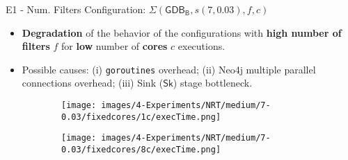 \begin{frame}{E1 - Num. Filters Configuration: \small{$\Sigma(\mathsf{GDB_B}, s(7, 0.03), f, c)$}}
\begin{itemize}
    \item \textbf{Degradation} of the behavior of the configurations with \textbf{high number of filters} $f$ for \textbf{low} number of \textbf{cores} $c$ executions.
    \item Possible causes: (i) \texttt{goroutines} overhead; (ii) Neo4j multiple parallel connections overhead; (iii) Sink ($\mathsf{Sk}$) stage bottleneck.
\end{itemize}
\begin{figure}
    \centering
    \hspace*{-1.6cm} %
    \begin{subfigure}{0.5\textwidth}
        \centering
        \texttt{[image: images/4-Experiments/NRT/medium/7-0.03/fixedcores/1c/execTime.png]}
    \end{subfigure}
    \hspace*{1cm} 
    \begin{subfigure}{0.5\textwidth}
        \centering
        \texttt{[image: images/4-Experiments/NRT/medium/7-0.03/fixedcores/8c/execTime.png]}
    \end{subfigure}
\end{figure}
\end{frame}

